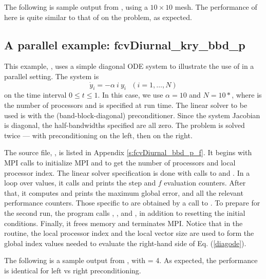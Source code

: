 The following is sample output from , using a $10 \times 10$ mesh.
The performance of {\fcvode} here is quite similar to that of {\cvode} on
the  problem, as expected.



\subsection{A parallel example: fcvDiurnal\_kry\_bbd\_p}\label{ss:fcvDiurnal_bbd_p}

This example, , uses a simple diagonal ODE system to illustrate
the use of {\fcvode} in a parallel setting.  The system is
\begin{equation} \label{diagode}
\dot{y}_i = - \alpha ~i~ y_i ~~~ (i = 1,\ldots, N)
\end{equation}
on the time interval $0 \leq t \leq 1$.  In this case, we use $\alpha = 10$
and $N = 10*$, where  is the number of processors
and is specified at run time.  The linear solver to be used is
{\spgmr} with the {\cvbbdpre} (band-block-diagonal) preconditioner.
Since the system Jacobian is diagonal, the half-bandwidths specified
are all zero.  The problem is solved twice --- with preconditioning on
the left, then on the right.

The source file, , is listed in Appendix \ref{s:fcvDiurnal_bbd_p_f}.
It begins with MPI calls to initialize MPI and to get the number of processors
and local processor index.  The linear solver specification is done with
calls to  and .  In a loop over 
values, it calls  and prints the step and $f$ evaluation counters.
After that, it computes and prints the maximum global error, and all the
relevant performance counters.  Those specific to {\cvbbdpre} are obtained
by a call to .  To prepare for the second run, the program
calls , , and , in addition
to resetting the initial conditions.  Finally, it frees memory and terminates MPI.
Notice that in the  routine, the local processor index 
and the local vector size  are used to form the global index
values needed to evaluate the right-hand side of Eq. (\ref{diagode}).

The following is a sample output from , with  = 4.
As expected, the performance is identical for left vs right preconditioning.


